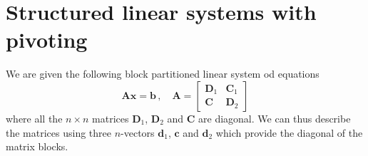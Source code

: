 \documentclass{article}
\begin{document}
\section*{Structured linear systems with pivoting}
We are given the following block partitioned linear system od equations
\begin{equation*}
    \mathbf{A}\mathbf{x} = \mathbf{b}\,,\quad \mathbf{A} = \begin{bmatrix}
    \mathbf{D}_{1} & \mathbf{C}_{1} \\ \mathbf{C} & \mathbf{D}_{2}
    \end{bmatrix}
\end{equation*}
where all the $n \times n$ matrices $\mathbf{D}_{1}$, $\mathbf{D}_{2}$ and $\mathbf{C}$ are diagonal. We can thus describe the matrices using three $n$-vectors $\mathbf{d}_{1}$, $\mathbf{c}$ and $\mathbf{d}_{2}$ which provide the diagonal of the matrix blocks. 
\end{document}
